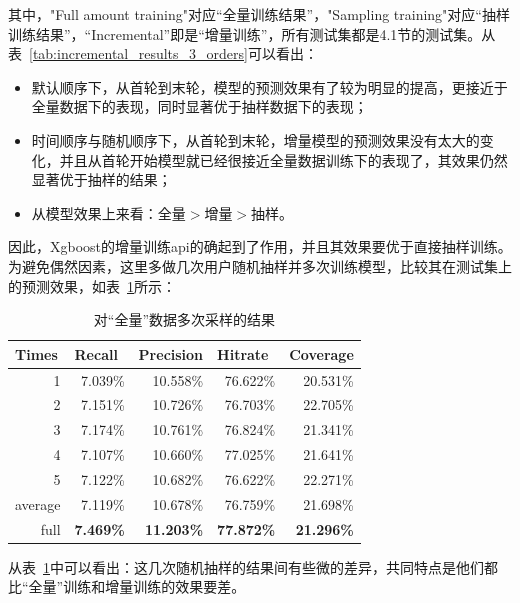     其中，"Full amount training"对应“全量训练结果”，"Sampling training"对应“抽样训练结果”，“Incremental”即是“增量训练”，所有测试集都是4.1节的测试集。从表~\ref{tab:incremental_results_3_orders}可以看出：
    \begin{itemize}
      \item 默认顺序下，从首轮到末轮，模型的预测效果有了较为明显的提高，更接近于全量数据下的表现，同时显著优于抽样数据下的表现；
      \item 时间顺序与随机顺序下，从首轮到末轮，增量模型的预测效果没有太大的变化，并且从首轮开始模型就已经很接近全量数据训练下的表现了，其效果仍然显著优于抽样的结果；
      \item 从模型效果上来看：全量$>$增量$>$抽样。
    \end{itemize}

    因此，Xgboost的增量训练api的确起到了作用，并且其效果要优于直接抽样训练。为避免偶然因素，这里多做几次用户随机抽样并多次训练模型，比较其在测试集上的预测效果，如表~\ref{tab:multiple_sampling}所示：
    \begin{table}[htbp]
      \centering
      \caption{对“全量”数据多次采样的结果}
      \begin{tabular}{rrrrr}
        \toprule
        \multicolumn{1}{l}{Times} & \multicolumn{1}{l}{Recall} & \multicolumn{1}{l}{Precision} & \multicolumn{1}{l}{Hit\;rate} & \multicolumn{1}{l}{Coverage} \\
        \midrule
        1    & 7.039\% & 10.558\% & 76.622\% & 20.531\% \\
        2    & 7.151\% & 10.726\% & 76.703\% & 22.705\% \\
        3    & 7.174\% & 10.761\% & 76.824\% & 21.341\% \\
        4    & 7.107\% & 10.660\% & 77.025\% & 21.641\% \\
        5    & 7.122\% & 10.682\% & 76.622\% & 22.271\% \\
        average & 7.119\% & 10.678\% & 76.759\% & 21.698\% \\
        full & \textbf{7.469\%} & \textbf{11.203\%} & \textbf{77.872\%} & \textbf{21.296\%} \\
        \bottomrule
      \end{tabular}%
      \label{tab:multiple_sampling}%
    \end{table}%

    从表~\ref{tab:multiple_sampling}中可以看出：这几次随机抽样的结果间有些微的差异，共同特点是他们都比“全量”训练和增量训练的效果要差。

